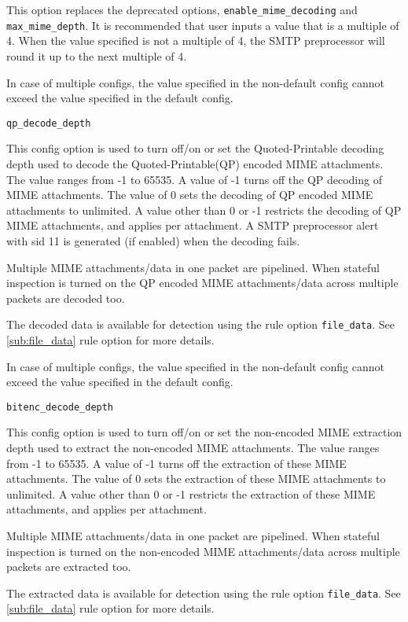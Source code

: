 \documentclass[english]{report}
\newcounter{slistnum}
\newenvironment{slist}
{ \begin{list}{ {\bf \arabic{slistnum}.} }{\usecounter{slistnum} } }
{ \end{list} }
\begin{document}
\begin{slist}
This option replaces the deprecated options, \texttt{enable\_mime\_decoding} and 
\texttt{max\_mime\_depth}.  It is recommended that user inputs a value that is a 
multiple of 4. When the value specified is not a multiple of 4, the SMTP preprocessor 
will round it up to the next multiple of 4.

In case of multiple configs, the value specified in the non-default config cannot
exceed the value specified in the default config.

\item \texttt{qp\_decode\_depth}

This config option is used to turn off/on or set the Quoted-Printable decoding depth
used to decode the Quoted-Printable(QP) encoded MIME attachments. The value ranges
from -1 to 65535. A value of -1 turns off the QP decoding of MIME attachments.
The value of 0 sets the decoding of QP encoded MIME attachments to unlimited. A
value other than 0 or -1 restricts the decoding of QP MIME attachments, and applies per 
attachment. A SMTP preprocessor alert with sid 11 is generated (if enabled) when the decoding fails.

Multiple MIME attachments/data in one packet are pipelined. When stateful inspection 
is turned on the QP encoded MIME attachments/data across multiple packets are decoded too.

The decoded data is available for detection using the rule option \texttt{file\_data}.
See \ref{sub:file_data} rule option for more details.

In case of multiple configs, the value specified in the non-default config cannot exceed
the value specified in the default config.

\item \texttt{bitenc\_decode\_depth}

This config option is used to turn off/on or set the non-encoded MIME extraction
depth used to extract the non-encoded MIME attachments. The value ranges from -1 
to 65535. A value of -1 turns off the extraction of these MIME attachments. 
The value of 0 sets the extraction of these MIME attachments to unlimited.
A value other than 0 or -1 restricts the extraction of these MIME attachments, and applies 
per attachment.

Multiple MIME attachments/data in one packet are pipelined. When stateful inspection 
is turned on the non-encoded MIME attachments/data across multiple packets are extracted too.

The extracted data is available for detection using the rule option \texttt{file\_data}.
See \ref{sub:file_data} rule option for more details.


\end{slist}
\end{document}
